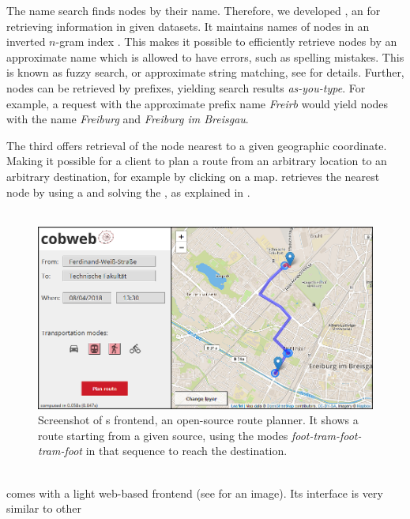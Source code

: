 	The name search \api finds \osm nodes by their name. Therefore, we developed \lexiSearch {}, an \api for retrieving
	information in given datasets.
	It maintains names of \osm nodes in an inverted $n$-gram index . This makes it possible to efficiently
	retrieve nodes by an approximate name which is allowed to have errors, such as spelling mistakes. This is known as fuzzy search, or
	approximate string matching, see  for details. Further, nodes can be retrieved by prefixes, yielding search
	results \textit{as-you-type}. For example, a request with the approximate prefix name \textit{Freirb} would yield nodes with
	the name \textit{Freiburg} and \textit{Freiburg im Breisgau}.
	
	The third \api offers retrieval of the \osm node nearest to a given geographic coordinate. Making it possible for a client to plan a
	route from an arbitrary location to an arbitrary destination, for example by clicking on a map. \cobweb retrieves the nearest node by
	using a \coverTree and solving the \nearestNeighborProblem, as explained in .\\\\
	\begin{figure}[!ht]
		 \begin{center}
			\includegraphics[scale=0.5]{res/cobweb_frontend}
		\end{center}
		\caption{Screenshot of {\cobweb}s  frontend, an open-source \multiModal route planner. It shows a \multiModal
		route starting from a given source, using the modes \textit{foot-tram-foot-tram-foot} in that sequence to reach the destination.}
		\label{cobweb_frontend}
	\end{figure}\quad\\
	\cobweb comes with a light web-based frontend (see  for an image). Its interface is very similar to other

